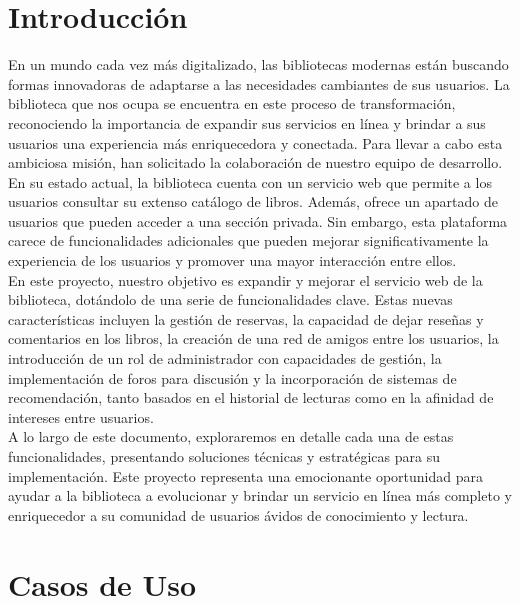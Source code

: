 ﻿\documentclass{report}
\begin{document}
    \chapter{Introducción}
    En un mundo cada vez más digitalizado, las bibliotecas modernas están buscando formas innovadoras de adaptarse a las necesidades cambiantes de sus usuarios. La biblioteca que nos ocupa se encuentra en este proceso de transformación, reconociendo la importancia de expandir sus servicios en línea y brindar a sus usuarios una experiencia más enriquecedora y conectada. Para llevar a cabo esta ambiciosa misión, han solicitado la colaboración de nuestro equipo de desarrollo.\\
    En su estado actual, la biblioteca cuenta con un servicio web que permite a los usuarios consultar su extenso catálogo de libros. Además, ofrece un apartado de usuarios que pueden acceder a una sección privada. Sin embargo, esta plataforma carece de funcionalidades adicionales que pueden mejorar significativamente la experiencia de los usuarios y promover una mayor interacción entre ellos.\\
    En este proyecto, nuestro objetivo es expandir y mejorar el servicio web de la biblioteca, dotándolo de una serie de funcionalidades clave. Estas nuevas características incluyen la gestión de reservas, la capacidad de dejar reseñas y comentarios en los libros, la creación de una red de amigos entre los usuarios, la introducción de un rol de administrador con capacidades de gestión, la implementación de foros para discusión y la incorporación de sistemas de recomendación, tanto basados en el historial de lecturas como en la afinidad de intereses entre usuarios.\\
    A lo largo de este documento, exploraremos en detalle cada una de estas funcionalidades, presentando soluciones técnicas y estratégicas para su implementación. Este proyecto representa una emocionante oportunidad para ayudar a la biblioteca a evolucionar y brindar un servicio en línea más completo y enriquecedor a su comunidad de usuarios ávidos de conocimiento y lectura.\\
    \chapter{Casos de Uso}
\end{document}
